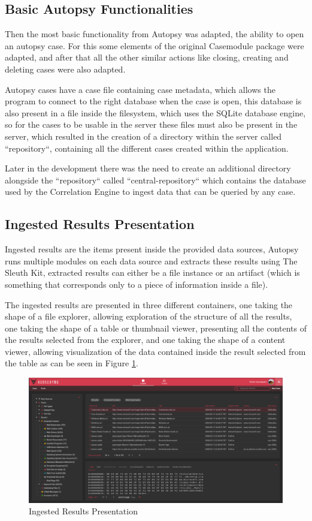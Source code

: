 \subsection{Basic Autopsy Functionalities}

Then the most basic functionality from Autopsy was adapted, the ability to open an autopsy case. For this some elements of the original Casemodule package were adapted,
and after that all the other similar actions like closing, creating and deleting cases were also adapted.

Autopsy cases have a case file containing case metadata, which allows the program to connect to the right database when the case is open, this database is also present
in a file inside the filesystem, which uses the SQLite database engine, so for the cases to be usable in the server these files must also be present in the server,
which resulted in the creation of a directory within the server called ``repository``, containing all the different cases created within the application.

Later in the development there was the need to create an additional directory alongside the ``repository`` called ``central-repository``
which contains the database used by the Correlation Engine to ingest data that can be queried by any case.

\subsection{Ingested Results Presentation}

Ingested results are the items present inside the provided data sources, Autopsy runs multiple modules on each data source and extracts these results using The Sleuth Kit,
extracted results can either be a file instance or an artifact (which is something that corresponds only to a piece of information inside a file).

The ingested results are presented in three different containers, one taking the shape of a file explorer, allowing exploration of the structure of all the results, 
one taking the shape of a table or thumbnail viewer, presenting all the contents of the results selected from the explorer, and one taking the shape of a content viewer, allowing visualization
of the data contained inside the result selected from the table as can be seen in Figure \ref{fig:data}.

\begin{figure}[h]
 \centering
 \includegraphics[width=1\linewidth]{imgs/data.png}
 \caption{Ingested Results Presentation}
 \label{fig:data}
\end{figure}

